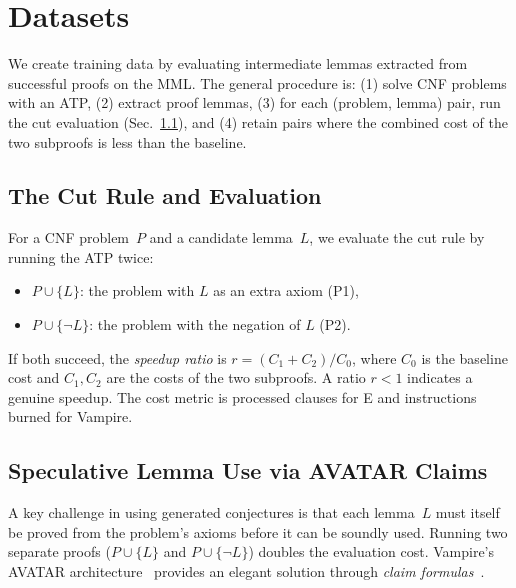 \documentclass{easychair}
\newcommand{\Eprover}{E\xspace}
\newcommand{\Vampire}{Vampire\xspace}
\newcommand{\MML}{MML\xspace}
\begin{document}
\section{Datasets}
\label{sec:dataset}

We create training data by evaluating intermediate lemmas extracted
from successful proofs on the \MML.  The general procedure is: (1)
solve CNF problems with an ATP, (2) extract proof lemmas, (3) for each
(problem, lemma) pair, run the cut evaluation (Sec.~\ref{sec:cut}),
and (4) retain pairs where the combined cost of the two subproofs is
less than the baseline.

\subsection{The Cut Rule and Evaluation}
\label{sec:cut}

For a CNF problem~$P$ and a candidate lemma~$L$, we evaluate the cut
rule by running the ATP twice:
\begin{itemize}
\item $P \cup \{L\}$: the problem with $L$ as an extra axiom (P1),
\item $P \cup \{\neg L\}$: the problem with the negation of $L$ (P2).
\end{itemize}
If both succeed, the \emph{speedup ratio} is $r = (C_1 + C_2) / C_0$,
where $C_0$ is the baseline cost and $C_1, C_2$ are the costs of the
two subproofs.  A ratio $r < 1$ indicates a genuine speedup.  The cost
metric is processed clauses for \Eprover and instructions burned for
\Vampire.

\subsection{Speculative Lemma Use via AVATAR Claims}
\label{sec:avatar}

A key challenge in using generated conjectures is that each lemma~$L$
must itself be proved from the problem's axioms before it can be
soundly used.  Running two separate proofs ($P \cup \{L\}$ and
$P \cup \{\neg L\}$) doubles the evaluation cost.
\Vampire's AVATAR architecture~\cite{Kovacs2013,Voronkov2014}
provides an elegant solution through \emph{claim
formulas}~\cite{Einarsdottir2024}.
\end{document}
